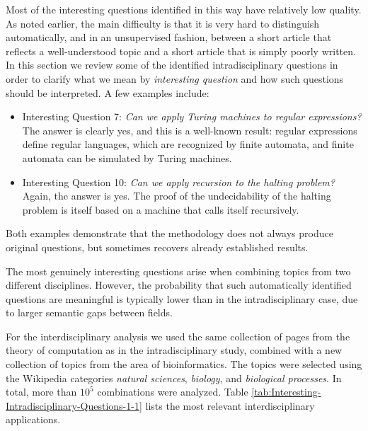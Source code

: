 Most of the interesting questions identified in this way have relatively low quality. As noted earlier, the main difficulty is that it is very hard to distinguish automatically, and in an unsupervised fashion, between a short article that reflects a well-understood topic and a short article that is simply poorly written. In this section we review some of the identified intradisciplinary questions in order to clarify what we mean by \emph{interesting question} and how such questions should be interpreted. A few examples include:
\begin{itemize}
\item Interesting Question 7: \emph{Can we apply Turing machines to regular expressions?} The answer is clearly yes, and this is a well-known result: regular expressions define regular languages, which are recognized by finite automata, and finite automata can be simulated by Turing machines.
\item Interesting Question 10: \emph{Can we apply recursion to the halting problem?} Again, the answer is yes. The proof of the undecidability of the halting problem is itself based on a machine that calls itself recursively.
\end{itemize}
Both examples demonstrate that the methodology does not always produce original questions, but sometimes recovers already established results.

The most genuinely interesting questions arise when combining topics from two different disciplines. However, the probability that such automatically identified questions are meaningful is typically lower than in the intradisciplinary case, due to larger semantic gaps between fields.

For the interdisciplinary analysis we used the same collection of pages from the theory of computation as in the intradisciplinary study, combined with a new collection of topics from the area of bioinformatics. The topics were selected using the Wikipedia categories \emph{natural sciences}, \emph{biology}, and \emph{biological processes}. In total, more than $10^{5}$ combinations were analyzed. Table \ref{tab:Interesting-Intradisciplinary-Questions-1-1} lists the most relevant interdisciplinary applications.

